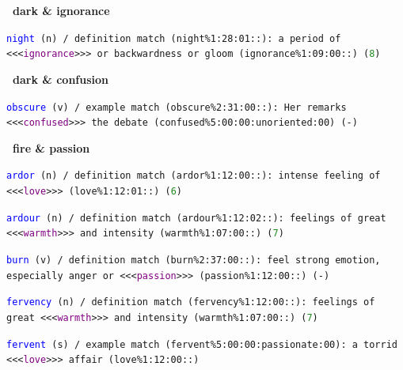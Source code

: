 \documentclass[12pt,a4paper]{article}
\begin{document}
{\clearpage  %

\noindent\textbf{\textbullet\ dark \& ignorance}

\texttt{\textcolor{blue}{night} (n) / definition match (night\%1:28:01::): a period of <<<\textcolor{purple}{ignorance}>>> or backwardness or gloom (ignorance\%1:09:00::) (\textcolor{ForestGreen}{8})}

\vspace{1em}

\noindent\textbf{\textbullet\ dark \& confusion}

\texttt{\textcolor{blue}{obscure} (v) / example match (obscure\%2:31:00::): Her remarks <<<\textcolor{purple}{confused}>>> the debate (confused\%5:00:00:unoriented:00) (-)}

\vspace{1em}

\noindent\textbf{\textbullet\ fire \& passion}

\texttt{\textcolor{blue}{ardor} (n) / definition match (ardor\%1:12:00::): intense feeling of <<<\textcolor{purple}{love}>>> (love\%1:12:01::) (\textcolor{ForestGreen}{6}) }



\texttt{\textcolor{blue}{ardour} (n) / definition match (ardour\%1:12:02::): feelings of great <<<\textcolor{purple}{warmth}>>> and intensity (warmth\%1:07:00::) (\textcolor{ForestGreen}{7}) }

\texttt{\textcolor{blue}{burn} (v) / definition match (burn\%2:37:00::): feel strong emotion, especially anger or <<<\textcolor{purple}{passion}>>> (passion\%1:12:00::) (-)}

\texttt{\textcolor{blue}{fervency} (n) / definition match (fervency\%1:12:00::): feelings of great <<<\textcolor{purple}{warmth}>>> and intensity (warmth\%1:07:00::) (\textcolor{ForestGreen}{7}) }

\texttt{\textcolor{blue}{fervent} (s) / example match (fervent\%5:00:00:passionate:00): a torrid <<<\textcolor{purple}{love}>>> affair (love\%1:12:00::)}


}
\end{document}
